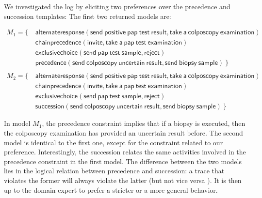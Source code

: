 We investigated the log by eliciting two preferences over the \textsf{precedence} and \textsf{succession} templates:
The first two returned models are:

\begin{align*}
M_1 = \{ \ &  \mathsf{ alternateresponse(send\ positive\ pap\ test\ result, take\ a\ colposcopy\ examination)} \\
& \mathsf{ chainprecedence(invite, take\ a\ pap\ test\ examination)} \\
& \mathsf{ exclusivechoice(send\ pap\ test\ sample, reject)} \\
& \mathsf{precedence(send\ colposcopy\ uncertain\ result, send\ biopsy\ sample)} \ \}  \\ \\
M_2 = \{ \ &  \mathsf{ alternateresponse(send\ positive\ pap\ test\ result, take\ a\ colposcopy\ examination)} \\
& \mathsf{ chainprecedence(invite, take\ a\ pap\ test\ examination)} \\
& \mathsf{ exclusivechoice(send\ pap\ test\ sample, reject)} \\
& \mathsf{succession(send\ colposcopy\ uncertain\ result, send\ biopsy\ sample)} \ \}  
\end{align*}

In model $M_1$, the \textsf{precedence} constraint implies that if a biopsy is executed, then the colposcopy examination has provided an uncertain result before. The second model is identical to the first one, except for the constraint related %
to our preference. Interestingly, the \textsf{succession} relates %
the same activities involved in %
the \textsf{precedence} constraint in the first model. The difference between the two models lies in the logical relation between \textsf{precedence} and \textsf{succession}: a trace that violates the former will always violate the latter (but not vice versa%
). It is then up to the domain expert to prefer a stricter or a more general behavior.

